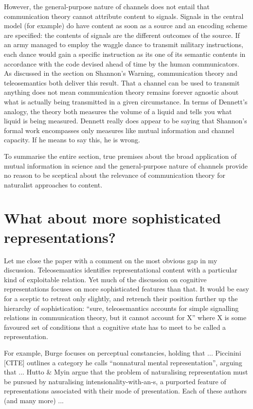 \documentclass[12pt]{article}
\begin{document}
However, the general-purpose nature of channels does not entail that communication theory cannot attribute content to signals.
Signals in the central model (for example) do have content as soon as a source and an encoding scheme are specified: the contents of signals are the different outcomes of the source.
If an army managed to employ the waggle dance to transmit military instructions, each dance would gain a specific instruction as its one of its semantic contents in accordance with the code devised ahead of time by the human communicators.
As discussed in the section on Shannon's Warning, communication theory and teleosemantics both deliver this result.
That a channel can be used to transmit anything does not mean communication theory remains forever agnostic about what is actually being transmitted in a given circumstance.
In terms of Dennett's analogy, the theory both measures the volume of a liquid and tells you what liquid is being measured.
Dennett really does appear to be saying that Shannon's formal work encompasses only measures like mutual information and channel capacity.
If he means to say this, he is wrong.

To summarise the entire section, true premises about the broad application of mutual information in science and the general-purpose nature of channels provide no reason to be sceptical about the relevance of communication theory for naturalist approaches to content.

\section{What about more sophisticated representations?}\label{sec:sophisticated}

Let me close the paper with a comment on the most obvious gap in my discussion.
Teleosemantics identifies representational content with a particular kind of exploitable relation. 
Yet much of the discussion on cognitive representations focuses on more sophisticated features than that.
It would be easy for a sceptic to retreat only slightly, and retrench their position further up the hierarchy of sophistication: ``sure, teleosemantics accounts for simple signalling relations in communication theory, but it cannot account for X'' where X is some favoured set of conditions that a cognitive state has to meet to be called a representation.

For example, Burge focuses on perceptual constancies, holding that ...
Piccinini [CITE] outlines a category he calls ``nonnatural mental representation'', arguing that ...
Hutto \& Myin argue that the problem of naturalising representation must be pursued by naturalising intensionality-with-an-s, a purported feature of representations associated with their mode of presentation.
Each of these authors (and many more) ...
\end{document}
